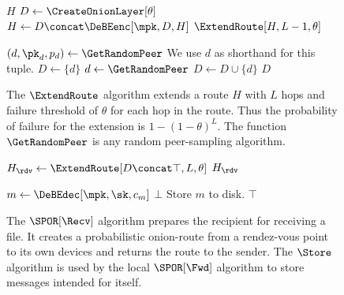 
\begin{figure}
  \begin{algorithmic}
        \State \Return $H$
      \EndIf
      \State $D\gets \CreateOnionLayer[\theta]$
      \State $H\gets D\concat \DeBEenc[\mpk, D, H]$
      \State \Return $\ExtendRoute[H, L-1, \theta]$
    \EndFunction

    \Function{\CreateOnionLayer}{$\theta$}
      \State $(d, \pk_d, p_d)\gets \GetRandomPeer$
      \Comment We use \(d\) as shorthand for this tuple.
      \State $D\gets \{d\}$
        \State $d\gets \GetRandomPeer$
        \State $D\gets D\cup \{d\}$
      \EndWhile
      \State \Return $D$
    \EndFunction
  \end{algorithmic}
  \caption{\label{ExtendRoute}%
    The \(\ExtendRoute\) algorithm extends a route \(H\) with \(L\) hops and 
    failure threshold of \(\theta\) for each hop in the route.
    Thus the probability of failure for the extension is \(1 - (1 - \theta)^L\).
    The function \(\GetRandomPeer\) is any random peer-sampling algorithm.
  }
\end{figure}


\begin{figure}
  \begin{algorithmic}
      \State $H_\rdv\gets \ExtendRoute[D\concat \top, L, \theta]$
      \State \Return $H_\rdv$
    \EndFunction

      \State $m\gets \DeBEdec[\mpk, \sk, c_m]$
        \State \Return $\bot$
      \EndIf
      \State Store $m$ to disk.
      \State \Return $\top$
    \EndFunction
  \end{algorithmic}
  \caption{\label{SPORRecv}%
    The \(\SPOR[\Recv]\) algorithm prepares the recipient for receiving a file.
    It creates a probabilistic onion-route from a rendez-vous point to its own 
    devices and returns the route to the sender.
    The \(\Store\) algorithm is used by the local \(\SPOR[\Fwd]\) algorithm to 
    store messages intended for itself.
  }
\end{figure}

